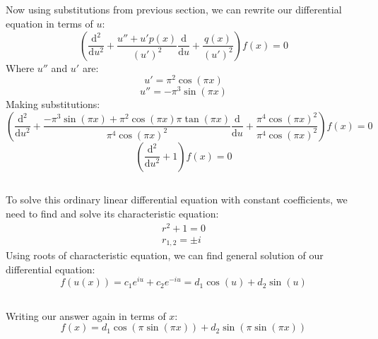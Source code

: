 \documentclass[12pt]{article}
\begin{document}
\subsection{}
Now using substitutions from previous section, we can rewrite our differential equation in terms of $u$:
\begin{equation}
    \left(\frac{\mathrm{d}^2}{\mathrm{d}u^2} + \frac{u''+u'p(x)}{(u')^2}\frac{\mathrm{d}}{\mathrm{d}u}+\frac{q(x)}{(u')^2}\right)f(x) = 0
\end{equation}
Where $u''$ and $u'$ are:
\begin{equation}
    u' = \pi^2\cos(\pi x)
\end{equation}
\begin{equation}
    u'' = -\pi^3\sin(\pi x)
\end{equation}
Making substitutions:
\begin{equation}
    \left(\frac{\mathrm{d}^2}{\mathrm{d}u^2} + \frac{-\pi^3\sin(\pi x)+\pi^2\cos(\pi x)\pi\tan(\pi x)}{\pi^4\cos(\pi x)^2}\frac{\mathrm{d}}{\mathrm{d}u}+\frac{\pi^4\cos(\pi x)^2}{\pi^4\cos(\pi x)^2}\right)f(x) = 0
\end{equation}
\begin{equation}
    \left(\frac{\mathrm{d}^2}{\mathrm{d}u^2} +1\right)f(x) = 0
\end{equation}
\subsection{}
To solve this ordinary linear differential equation with constant coefficients, we need to find and solve its characteristic equation:
\begin{equation}
    \begin{split}
        r^2 + 1 = 0\\
        r_{1,2} = \pm i
    \end{split}
\end{equation}
Using roots of characteristic equation, we can find general solution of our differential equation:
\begin{equation}
    f(u(x)) = c_1e^{iu} + c_2e^{-iu} =d_1\cos(u) + d_2\sin(u)
\end{equation}
\subsection{}
Writing our answer again in terms of $x$:
\begin{equation}
    f(x) = d_1\cos(\pi\sin(\pi x)) + d_2\sin(\pi\sin(\pi x))
\end{equation}
\end{document}

